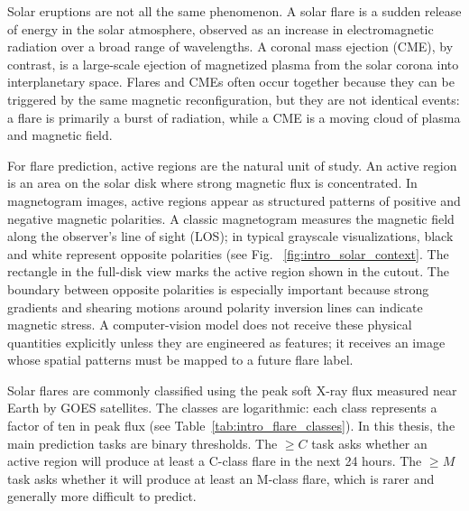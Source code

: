 Solar eruptions are not all the same phenomenon. A solar flare is a sudden release of energy in the solar atmosphere, observed as an increase in electromagnetic radiation over a broad range of wavelengths. A coronal mass ejection (CME), by contrast, is a large-scale ejection of magnetized plasma from the solar corona into interplanetary space. Flares and CMEs often occur together because they can be triggered by the same magnetic reconfiguration, but they are not identical events: a flare is primarily a burst of radiation, while a CME is a moving cloud of plasma and magnetic field.

For flare prediction, active regions are the natural unit of study. An active region is an area on the solar disk where strong magnetic flux is concentrated. In magnetogram images, active regions appear as structured patterns of positive and negative magnetic polarities. A classic magnetogram measures the magnetic field along the observer's line of sight (LOS); in typical grayscale visualizations, black and white represent opposite polarities (see Fig. ~\ref{fig:intro_solar_context}. The rectangle in the full-disk view marks the active region shown in the cutout. The boundary between opposite polarities is especially important because strong gradients and shearing motions around polarity inversion lines can indicate magnetic stress. A computer-vision model does not receive these physical quantities explicitly unless they are engineered as features; it receives an image whose spatial patterns must be mapped to a future flare label.

Solar flares are commonly classified using the peak soft X-ray flux measured near Earth by GOES satellites. The classes are logarithmic: each class represents a factor of ten in peak flux (see Table~\ref{tab:intro_flare_classes}). In this thesis, the main prediction tasks are binary thresholds. The $\geq C$ task asks whether an active region will produce at least a C-class flare in the next 24 hours. The $\geq M$ task asks whether it will produce at least an M-class flare, which is rarer and generally more difficult to predict.

